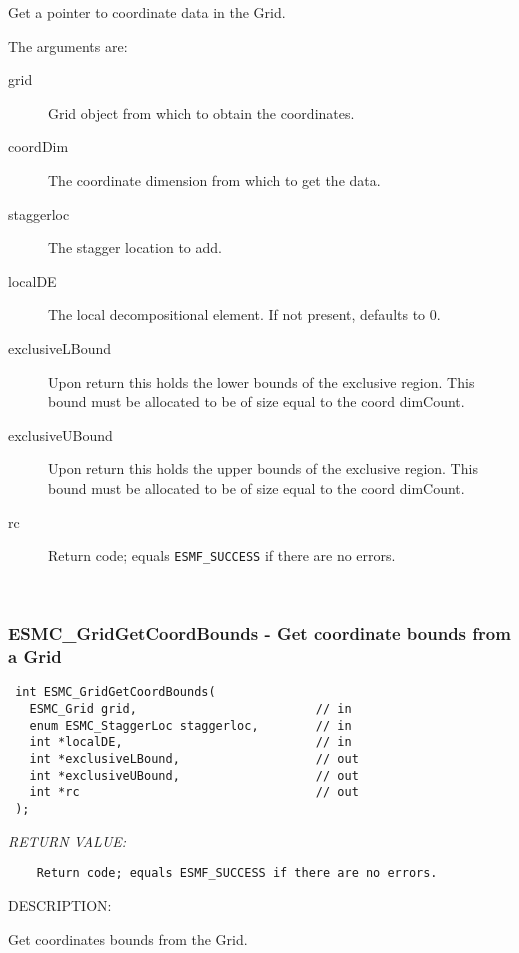    Get a pointer to coordinate data in the Grid.
  
    The arguments are:
    \begin{description}
    \item[grid]
      Grid object from which to obtain the coordinates.
    \item[coordDim]
      The coordinate dimension from which to get the data.
    \item[staggerloc]
      The stagger location to add.
    \item[localDE]
      The local decompositional element. If not present, defaults to 0.
    \item[exclusiveLBound]
      Upon return this holds the lower bounds of the exclusive region. This bound
      must be allocated to be of size equal to the coord dimCount.  
    \item[exclusiveUBound]
      Upon return this holds the upper bounds of the exclusive region. This bound
      must be allocated to be of size equal to the coord dimCount.  
    \item[rc]
    Return code; equals {\tt ESMF\_SUCCESS} if there are no errors. 
    \end{description}
   
 
\mbox{}\hrulefill\ 
 
\subsubsection [ESMC\_GridGetCoordBounds] {ESMC\_GridGetCoordBounds - Get coordinate bounds from a Grid}


  
\begin{verbatim} int ESMC_GridGetCoordBounds(
   ESMC_Grid grid,                         // in
   enum ESMC_StaggerLoc staggerloc,        // in
   int *localDE,                           // in
   int *exclusiveLBound,                   // out
   int *exclusiveUBound,                   // out
   int *rc                                 // out
 );
 \end{verbatim}{\em RETURN VALUE:}
\begin{verbatim}    Return code; equals ESMF_SUCCESS if there are no errors.\end{verbatim}
{\sf DESCRIPTION:\\ }


    Get coordinates bounds from the Grid.
  
